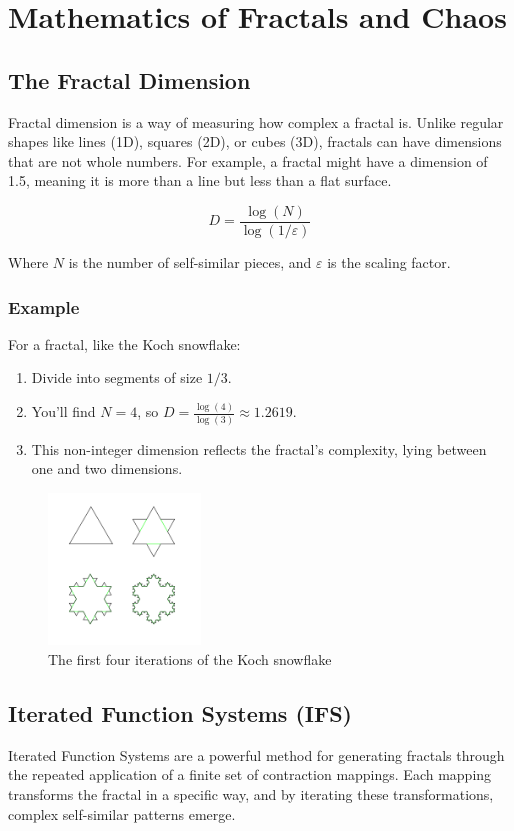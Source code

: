 \documentclass[12pt]{article}
\begin{document}
\section{Mathematics of Fractals and Chaos}

\subsection{The Fractal Dimension}
Fractal dimension is a way of measuring how complex a fractal is. Unlike regular shapes like lines (1D), squares (2D), or cubes (3D), fractals can have dimensions that are not whole numbers. For example, a fractal might have a dimension of 1.5, meaning it is more than a line but less than a flat surface. 

\[
D = \frac{\log(N)}{\log(1/\varepsilon)}
\]

Where \( N \) is the number of self-similar pieces, and \( \varepsilon \) is the scaling factor.

\subsubsection{Example}
For a fractal, like the Koch snowflake:
	\begin{enumerate}
		\item Divide into segments of size \(1/3\).
		\item You’ll find \(N = 4\), so \(D = \frac{\log(4)}{\log(3)} \approx 1.2619\).
		\item This non-integer dimension reflects the fractal's complexity, lying between one and two dimensions.
	\end{enumerate}
\begin{figure}[H] \centering \includegraphics[width=0.36\textwidth]{assets/KochFlake.png} \caption{The first four iterations of the Koch snowflake} \label{fig:example} \end{figure}

\subsection{Iterated Function Systems (IFS)}
Iterated Function Systems are a powerful method for generating fractals through the repeated application of a finite set of contraction mappings. Each mapping transforms the fractal in a specific way, and by iterating these transformations, complex self-similar patterns emerge.
\end{document}
